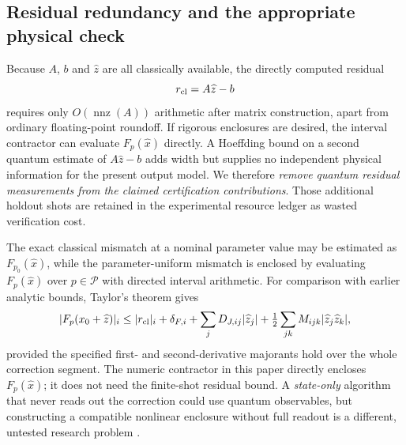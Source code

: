 \documentclass[11pt,a4paper]{article}
\theoremstyle{remark}\newtheorem{remark}[theorem]{Remark}
\begin{document}
\subsection{Residual redundancy and the appropriate physical check}
Because $A$, $b$ and $\widehat z$ are all classically available, the directly computed residual
\begin{equation}\label{eq:exactresidual}
 r_{\rm cl}=A\widehat z-b
\end{equation}
requires only $O(\operatorname{nnz}(A))$ arithmetic after matrix construction, apart from ordinary floating-point roundoff. If rigorous enclosures are desired, the interval contractor can evaluate $F_p(\widehat x)$ directly. A Hoeffding bound on a second quantum estimate of $A\widehat z-b$ adds width but supplies no independent physical information for the present output model. We therefore \emph{remove quantum residual measurements from the claimed certification contributions}. Those additional holdout shots are retained in the experimental resource ledger as wasted verification cost.

The exact classical mismatch at a nominal parameter value may be estimated as $F_{p_0}(\widehat x)$, while the parameter-uniform mismatch is enclosed by evaluating $F_p(\widehat x)$ over $p\in\mathcal P$ with directed interval arithmetic. For comparison with earlier analytic bounds, Taylor's theorem gives
\begin{equation}\label{eq:mismatch}
 |F_p(x_0+\widehat z)|_i\le |r_{\rm cl}|_i+\delta_{F,i}+\sum_jD_{J,ij}|\widehat z_j|+\tfrac12\sum_{jk}M_{ijk}|\widehat z_j\widehat z_k|,
\end{equation}
provided the specified first- and second-derivative majorants hold over the whole correction segment. The numeric contractor in this paper directly encloses $F_p(\widehat x)$; it does not need the finite-shot residual bound. A \emph{state-only} algorithm that never reads out the correction could use quantum observables, but constructing a compatible nonlinear enclosure without full readout is a different, untested research problem \citep{li2026}.
\end{document}
